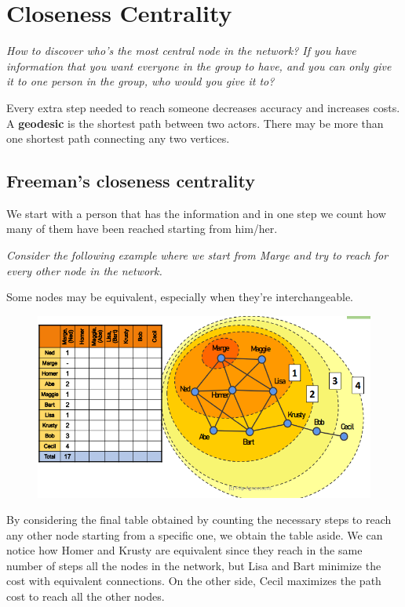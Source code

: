 \documentclass[
  notitlepage,
  onecolumn,
  openany]{book}
\begin{document}
\hypertarget{closeness-centrality}{%
\section{Closeness Centrality}\label{closeness-centrality}}

\emph{How to discover who's the most central node in the network? If you have information that you want everyone in the group to have, and you can only give it to one person in the group, who would you give it to?}

Every extra step needed to reach someone decreases accuracy and increases costs. A \textbf{geodesic} is the shortest path between two actors. There may be more than one shortest path connecting any two vertices.

\hypertarget{freemans-closeness-centrality}{%
\subsection{Freeman's closeness centrality}\label{freemans-closeness-centrality}}

We start with a person that has the information and in one step we count how many of them have been reached starting from him/her.

\emph{Consider the following example where we start from Marge and try to reach for every other node in the network.}

Some nodes may be equivalent, especially when they're interchangeable.

\begin{figure}[h!]

{\centering \includegraphics[width=0.5\linewidth]{images/04-Centrality/Untitled} 

}

\end{figure}

By considering the final table obtained by counting the necessary steps to reach any other node starting from a specific one, we obtain the table aside. We can notice how Homer and Krusty are equivalent since they reach in the same number of steps all the nodes in the network, but Lisa and Bart minimize the cost with equivalent connections. On the other side, Cecil maximizes the path cost to reach all the other nodes.
\end{document}
